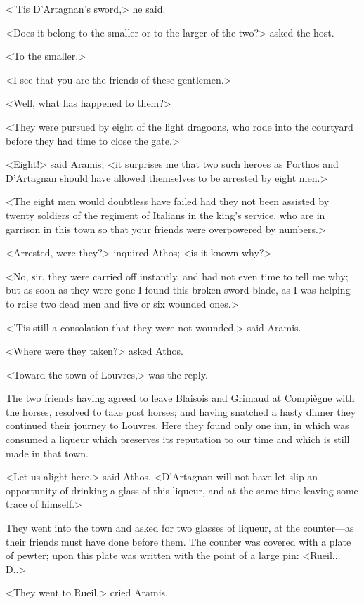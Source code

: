 <'Tis D'Artagnan's sword,> he said.

<Does it belong to the smaller or to the larger of the two?> asked the host.

<To the smaller.>

<I see that you are the friends of these gentlemen.>

<Well, what has happened to them?>

<They were pursued by eight of the light dragoons, who rode into the courtyard before they had time to close the gate.>

<Eight!> said Aramis; <it surprises me that two such heroes as Porthos and D'Artagnan should have allowed themselves to be arrested by eight men.>

<The eight men would doubtless have failed had they not been assisted by twenty soldiers of the regiment of Italians in the king's service, who are in garrison in this town so that your friends were overpowered by numbers.>

<Arrested, were they?> inquired Athos; <is it known why?>

<No, sir, they were carried off instantly, and had not even time to tell me why; but as soon as they were gone I found this broken sword-blade, as I was helping to raise two dead men and five or six wounded ones.>

<'Tis still a consolation that they were not wounded,> said Aramis.

<Where were they taken?> asked Athos.

<Toward the town of Louvres,> was the reply.

The two friends having agreed to leave Blaisois and Grimaud at Compiègne with the horses, resolved to take post horses; and having snatched a hasty dinner they continued their journey to Louvres. Here they found only one inn, in which was consumed a liqueur which preserves its reputation to our time and which is still made in that town.

<Let us alight here,> said Athos. <D'Artagnan will not have let slip an opportunity of drinking a glass of this liqueur, and at the same time leaving some trace of himself.>

They went into the town and asked for two glasses of liqueur, at the counter—as their friends must have done before them. The counter was covered with a plate of pewter; upon this plate was written with the point of a large pin: <Rueil... D..>

<They went to Rueil,> cried Aramis.

